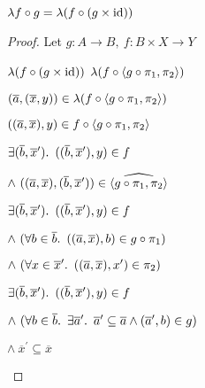 \begin{prop}
  $\lambda f\circ g = \lambda(f\circ (g\times\operatorname{id}))$
  \begin{proof}
    Let $g : A\to B,~f :B\times X\to Y$
    \begin{itemize}
    \step
      $\lambda(f\circ(g\times\operatorname{id}))$
    \step[=]
      $\lambda(f\circ\langle g\circ\pi_1,\pi_2\rangle)$
      \marginnote{\Def-$\times$}

    \addtolength{\itemsep}{.5\baselineskip}
    \step
      $(\overline{a},(\overline{x},y))\in \lambda(f\circ\langle g\circ\pi_1,\pi_2\rangle)$

    \addtolength{\itemsep}{-.5\baselineskip}
    \step[\iffs]
      $((\overline{a},\overline{x}),y)\in f\circ\langle g\circ\pi_1,\pi_2\rangle$
      \marginnote{\Def-$\lambda\cdot$}

    \step[\iffs]
      $\exists(\overline{b},\overline{x}^\prime)\ldotp~((\overline{b},\overline{x}^\prime),y)\in f$
      \marginnote{\Def-\ref{def:crel-comp}}

    \addtolength{\itemsep}{-.3\baselineskip}
    \step
      \quad$\land~((\overline{a},\overline{x}),(\overline{b},\overline{x}^\prime))\in\widehat{\langle g\circ\pi_1,\pi_2\rangle}$
    \addtolength{\itemsep}{.3\baselineskip}

    \step[\iffs]
      $\exists(\overline{b},\overline{x}^\prime)\ldotp~((\overline{b},\overline{x}^\prime),y)\in f$

    \addtolength{\itemsep}{-.3\baselineskip}
    \step
      \quad$\land~(\forall b\in\overline{b}\ldotp~((\overline{a},\overline{x}),b)\in g\circ\pi_1)$

    \step
      \quad$\land~(\forall x\in\overline{x}^\prime\ldotp~((\overline{a},\overline{x}),x^\prime)\in \pi_2)$
    \addtolength{\itemsep}{.3\baselineskip}

    \step[\iffs]
      $\exists(\overline{b},\overline{x}^\prime)\ldotp~((\overline{b},\overline{x}^\prime),y)\in f$

    \addtolength{\itemsep}{-.3\baselineskip}
    \step
      \quad$\land~(\forall b\in\overline{b}\ldotp~\exists\overline{a}^\prime\ldotp~\overline{a}^\prime\subseteq\overline{a}\land(\overline{a}^\prime,b)\in g)$

    \step
      \quad$\land~\overline{x}^\prime\subseteq\overline{x}$
    \addtolength{\itemsep}{.3\baselineskip}


\end{itemize}
\end{proof}
\end{prop}
